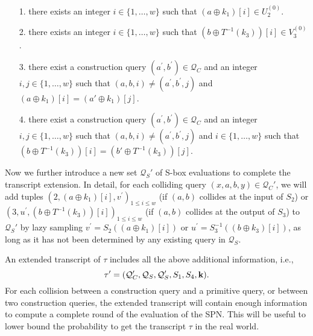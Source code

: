 \begin{itemize}
	\item[1.] there exists an integer $i \in\{1, \ldots, w\}$ such that $\left(a \oplus k_1\right)[i]\in U_2^{(0)}$.
	\item[2.] there exists an integer $i \in\{1, \ldots, w\}$ such that $\left(b \oplus T^{-1}(k_3)\right)[i]\in V_3^{(0)}$.
	\item[3.] there exist a construction query $\left(a^{\prime}, b^{\prime}\right) \in \mathcal{Q}_{C}$ and an integer $i,j \in\{1, \ldots, w\}$ such that $(a, b, i) \neq\left(a^{\prime}, b^{\prime}, j\right)$ and $\left(a \oplus k_1\right)[i] = \left(a' \oplus k_1\right)[j]$.
	\item[4.] there exist a construction query $\left(a^{\prime}, b^{\prime}\right) \in \mathcal{Q}_{C}$ and an integer $i,j \in\{1, \ldots, w\}$ such that $(a, b, i) \neq\left(a^{\prime}, b^{\prime}, j\right)$ and $i \in\{1, \ldots, w\}$ such that $\left(b \oplus T^{-1}(k_3)\right)[i] = \left(b' \oplus T^{-1}(k_3)\right)[j]$.
\end{itemize}
%
%
Now we further introduce a new set $\mathcal{Q}_{S}'$ of S-box evaluations to complete the transcript extension. In detail, for each colliding query $(x,a,b,y)\in\mathcal{Q}_C'$, we will add tuples $\left(2, (a \oplus k_1)[i], v^{\prime}\right)_{1 \leq i \leq w}$ (if $(a, b)$ collides at the input of $S_2$) or $\left(3, u^{\prime}, (b \oplus T^{-1}(k_3))[i]\right)_{1 \leq i \leq w}$ (if $(a, b)$ collides at the output of $S_3$) to $\mathcal{Q}_{S}'$ by lazy sampling $v^{\prime}=S_2(\left(a \oplus k_1\right)[i])$ or $u^{\prime}=S_3^{-1}(\left(b \oplus k_3\right)[i])$, as long as it has not been determined by any existing query in $\mathcal{Q}_S$.


An extended transcript of $\tau$ includes all the above additional information, i.e.,
%
$$\tau'=(\mathcal{Q}_{C}',\mathcal{Q}_{S},\mathcal{Q}_{S}',S_1,S_4,\mathbf{k}).$$
%
For each collision between a construction query and a primitive query, or between two construction queries, the extended transcript will contain enough information to compute a complete round of the evaluation of the SPN. This will be useful to lower bound the probability to get the transcript $\tau$ in the real world.


